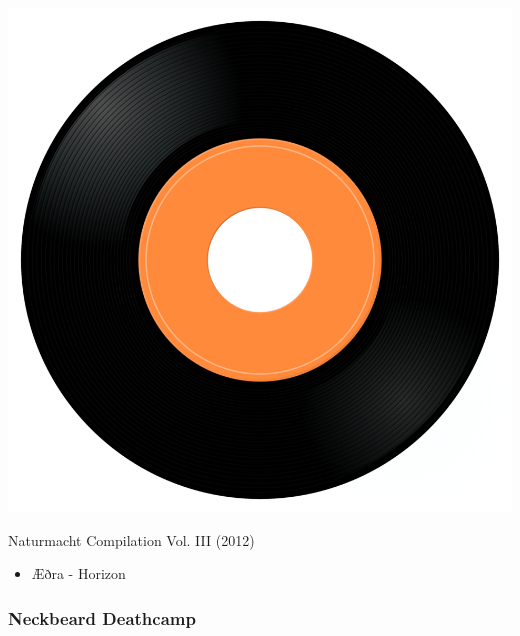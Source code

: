 \begin{minipage}[t]{0.25\textwidth}\vspace{0pt}
\captionsetup{type=figure}
\includegraphics[width=\textwidth]{Images/cover.png}
\caption*{Naturmacht Compilation Vol. III (2012)}
\end{minipage}
\begin{minipage}[t]{0.25\textwidth}\vspace{0pt}
\begin{itemize}[nosep,leftmargin=1em,labelwidth=*,align=left]
	\setlength{\itemsep}{0pt}
	\item Æðra - Horizon
\end{itemize}
\end{minipage}

\subsubsection{Neckbeard Deathcamp}

